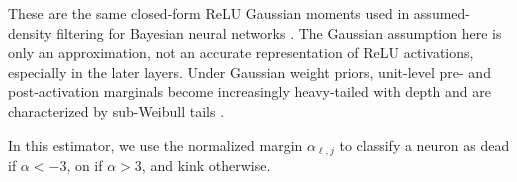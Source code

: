 These are the same closed-form ReLU Gaussian moments used in assumed-density filtering for Bayesian neural networks \citep{hernandez2015probabilistic, ghosh2016adf}. The Gaussian assumption here is only an approximation, not an accurate representation of ReLU activations, especially in the later layers. Under Gaussian weight priors, unit-level pre- and post-activation marginals become increasingly heavy-tailed with depth and are characterized by sub-Weibull tails \citep{vladimirova2019understanding}. 

In this estimator, we use the normalized margin $\alpha_{\ell,j}$ to classify a neuron as dead if $\alpha<-3$, on if $\alpha>3$, and kink otherwise.






